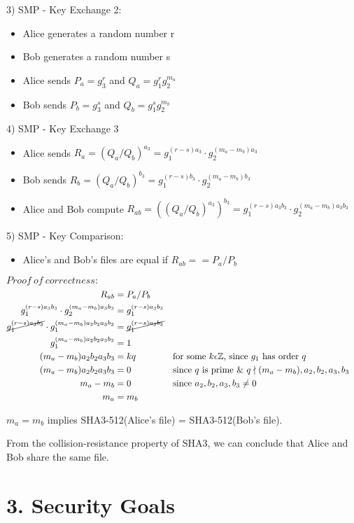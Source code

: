 \documentclass{article}
\begin{document}
3) SMP - Key Exchange 2:
\begin{itemize}
  \item Alice generates a random number r
  \item Bob generates a random number s
  \item Alice sends $P_a = g_3^r$ and $Q_a = g_1^rg_2^{m_a}$
  \item Bob sends $P_b = g_3^s$ and $Q_b = g_1^sg_2^{m_b}$
\end{itemize}

4) SMP - Key Exchange 3
\begin{itemize}
  \item Alice sends $R_a = (Q_a/Q_b)^{a_3} = g_1^{(r-s)a_3}\cdot g_2^{(m_a-m_b)a_3}$
  \item Bob sends $R_b = (Q_a/Q_b)^{b_3} = g_1^{(r-s)b_3}\cdot g_2^{(m_a-m_b)b_3}$
  \item Alice and Bob compute $R_{ab} = ((Q_a/Q_b)^{a_3})^{b_3} = 
  g_1^{(r-s)a_3b_3} \cdot g_2^{(m_a-m_b)a_3b_3}$
\end{itemize}
5) SMP - Key Comparison:
\begin{itemize}
  \item Alice's and Bob's files are equal if $R_{ab} == P_a / P_b$
\end{itemize}

$Proof\ of\ correctness:$
\begin{align*}
  R_{ab} &= P_a / P_b\\
  g_1^{(r-s)a_3b_3} \cdot g_2^{(m_a-m_b)a_3b_3} &= g_1^{(r-s)a_3b_3}\\
  \cancel{g_1^{(r-s)a_3b_3}} \cdot g_1^{(m_a-m_b)a_2b_2a_3b_3} &= \cancel{g_1^{(r-s)a_3b_3}}\\
  g_1^{(m_a-m_b)a_2b_2a_3b_3} &= 1\\
  (m_a-m_b)a_2b_2a_3b_3 &= kq && \text{for some $k \epsilon \mathbb{Z}$, since $g_1$ has order $q$}\\
  (m_a-m_b)a_2b_2a_3b_3 &= 0 && \text{since $q$ is prime \&\ } q \nmid (m_a-m_b), a_2, b_2,a_3, b_3\\
  m_a - m_b &= 0 &&\text{since $a_2, b_2, a_3, b_3 \neq 0$}\\
  m_a &= m_b
\end{align*}

$m_a = m_b$ implies SHA3-512(Alice's file) = SHA3-512(Bob's file).

From the collision-resistance property of SHA3, we can conclude that Alice and Bob 
share the same file.

\section*{3. Security Goals }
\end{document}
